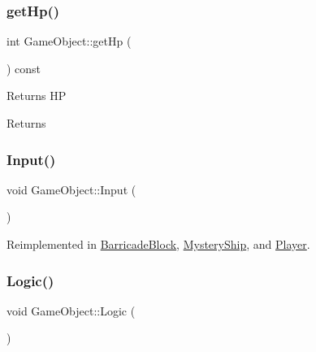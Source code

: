 \mbox{\label{class_game_object_a13b96d5c268bca096f8e3a3e85d35732}} 
\subsubsection{\texorpdfstring{get\+Hp()}{getHp()}}
{\footnotesize\ttfamily int Game\+Object\+::get\+Hp (\begin{DoxyParamCaption}{ }\end{DoxyParamCaption}) const}



Returns HP 

\begin{DoxyReturn}{Returns}

\end{DoxyReturn}
\mbox{\label{class_game_object_a430742cf91abb99337c556c88bef880a}} 
\subsubsection{\texorpdfstring{Input()}{Input()}}
{\footnotesize\ttfamily void Game\+Object\+::\+Input (\begin{DoxyParamCaption}{ }\end{DoxyParamCaption})\hspace{0.3cm}{\ttfamily [virtual]}}



Reimplemented in \mbox{\hyperlink{class_barricade_block_adc4d1d90b1d7ad2a6b043aef0a9886d2}{Barricade\+Block}}, \mbox{\hyperlink{class_mystery_ship_ad79eee772a091f9ea2b194744450e5f2}{Mystery\+Ship}}, and \mbox{\hyperlink{class_player_a65a76094cff6f149d5847d2110fe443d}{Player}}.

\mbox{\label{class_game_object_a79510ffc77339fe850491dce9f580fa9}} 
\subsubsection{\texorpdfstring{Logic()}{Logic()}}
{\footnotesize\ttfamily void Game\+Object\+::\+Logic (\begin{DoxyParamCaption}{ }\end{DoxyParamCaption})\hspace{0.3cm}{\ttfamily [virtual]}}



